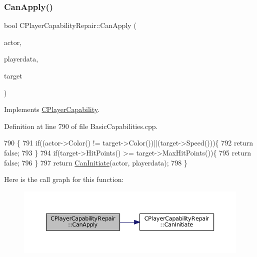 \subsubsection{\texorpdfstring{Can\+Apply()}{CanApply()}}
{\footnotesize\ttfamily bool C\+Player\+Capability\+Repair\+::\+Can\+Apply (\begin{DoxyParamCaption}\item[{std\+::shared\+\_\+ptr$<$ \hyperlink{classCPlayerAsset}{C\+Player\+Asset} $>$}]{actor,  }\item[{std\+::shared\+\_\+ptr$<$ \hyperlink{classCPlayerData}{C\+Player\+Data} $>$}]{playerdata,  }\item[{std\+::shared\+\_\+ptr$<$ \hyperlink{classCPlayerAsset}{C\+Player\+Asset} $>$}]{target }\end{DoxyParamCaption})\hspace{0.3cm}{\ttfamily [virtual]}}



Implements \hyperlink{classCPlayerCapability_ae96263e0950f496492f8baeb877b9554}{C\+Player\+Capability}.



Definition at line 790 of file Basic\+Capabilities.\+cpp.


\begin{DoxyCode}
790                                                                                                            
                                                   \{
791     \textcolor{keywordflow}{if}((actor->Color() != target->Color())||(target->Speed()))\{
792         \textcolor{keywordflow}{return} \textcolor{keyword}{false};   
793     \}
794     \textcolor{keywordflow}{if}(target->HitPoints() >= target->MaxHitPoints())\{
795         \textcolor{keywordflow}{return} \textcolor{keyword}{false};   
796     \}
797     \textcolor{keywordflow}{return} \hyperlink{classCPlayerCapabilityRepair_a579761cab74d447b95856a24a7841b2e}{CanInitiate}(actor, playerdata);
798 \}
\end{DoxyCode}
Here is the call graph for this function\+:\nopagebreak
\begin{figure}[H]
\begin{center}
\leavevmode
\includegraphics[width=350pt]{classCPlayerCapabilityRepair_ae989c67c5e14bbba5b2ddda993ee635a_cgraph}
\end{center}
\end{figure}
\hypertarget{classCPlayerCapabilityRepair_a579761cab74d447b95856a24a7841b2e}{}\label{classCPlayerCapabilityRepair_a579761cab74d447b95856a24a7841b2e} 
